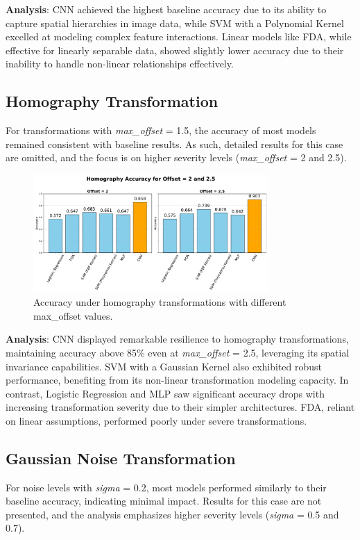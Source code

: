 \documentclass{article}
\begin{document}
\textbf{Analysis}:  
CNN achieved the highest baseline accuracy due to its ability to capture spatial hierarchies in image data, while SVM with a Polynomial Kernel excelled at modeling complex feature interactions. Linear models like FDA, while effective for linearly separable data, showed slightly lower accuracy due to their inability to handle non-linear relationships effectively.

\subsection{Homography Transformation}
For transformations with \textit{max\_offset} = 1.5, the accuracy of most models remained consistent with baseline results. As such, detailed results for this case are omitted, and the focus is on higher severity levels (\textit{max\_offset} = 2 and 2.5). 

\begin{figure}[h!]
    \centering
    \includegraphics[width=0.8\textwidth]{images/homography.pdf}
    \caption{Accuracy under homography transformations with different max\_offset values.}
    \label{fig:homography_accuracy}
\end{figure}

\textbf{Analysis}:  
CNN displayed remarkable resilience to homography transformations, maintaining accuracy above 85\% even at \textit{max\_offset} = 2.5, leveraging its spatial invariance capabilities. SVM with a Gaussian Kernel also exhibited robust performance, benefiting from its non-linear transformation modeling capacity. In contrast, Logistic Regression and MLP saw significant accuracy drops with increasing transformation severity due to their simpler architectures. FDA, reliant on linear assumptions, performed poorly under severe transformations.

\subsection{Gaussian Noise Transformation}
For noise levels with \textit{sigma} = 0.2, most models performed similarly to their baseline accuracy, indicating minimal impact. Results for this case are not presented, and the analysis emphasizes higher severity levels (\textit{sigma} = 0.5 and 0.7).
\end{document}
